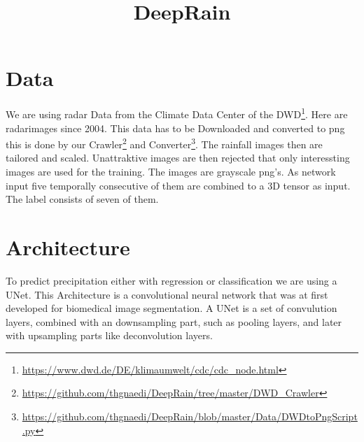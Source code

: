 \documentclass[oneside]{htwg-report}
\begin{document}



\newcommand{\verfasserA}{Thomas Gnädig}
\newcommand{\verfasserB}{Etienne Gramlich}
\newcommand{\verfasserC}{Merle Wolff}
\newcommand{\verfasserD}{Tim Hardenacke}
\newcommand{\verfasserE}{}
\newcommand{\thema}{DeepRain}
\newcommand{\hoschschule}{Hochschule für Technik, Wirtschaft und Gestaltung}
\newcommand{\institut}{HTWG Konstanz, Institut für Optische Systeme}
\newcommand{\prueferA}{Oliver Dürr}
\newcommand{\prueferB}{}


\title[Teamprojektthema]{\thema}


\makecover[]
%          
%


\twocolumn
\section*{Data}
We are using radar Data from the Climate Data Center of the DWD\footnote{\url{https://www.dwd.de/DE/klimaumwelt/cdc/cdc_node.html}}. Here are radarimages since 2004. 
This data has to be Downloaded and converted to png this is done by our Crawler\footnote{\url{https://github.com/thgnaedi/DeepRain/tree/master/DWD_Crawler}} and Converter\footnote{\url{https://github.com/thgnaedi/DeepRain/blob/master/Data/DWDtoPngScript.py}}.
The rainfall images then are tailored and scaled. Unattraktive images are then rejected that only interessting images are used for the training.
The images are grayscale png's. As network input five temporally consecutive of them are combined to a 3D tensor as input. The label consists of seven of them.

\section*{Architecture}
To predict precipitation either with regression or classification we are using a UNet.
This Architecture is a convolutional neural network that was at first developed for biomedical image segmentation.
A UNet is a set of convulution layers, combined with an downsampling part, such as pooling layers, and later with upsampling parts like deconvolution layers.
\end{document}
